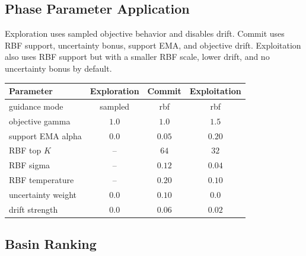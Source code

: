 \documentclass[11pt]{article}
\begin{document}
\subsection{Phase Parameter Application}

Exploration uses sampled objective behavior and disables drift. Commit uses
RBF support, uncertainty bonus, support EMA, and objective drift. Exploitation
also uses RBF support but with a smaller RBF scale, lower drift, and no
uncertainty bonus by default.

\begin{center}
\begin{tabular}{lccc}
\toprule
Parameter & Exploration & Commit & Exploitation \\
\midrule
guidance mode & sampled & rbf & rbf \\
objective gamma & $1.0$ & $1.0$ & $1.5$ \\
support EMA alpha & $0.0$ & $0.05$ & $0.20$ \\
RBF top $K$ & -- & $64$ & $32$ \\
RBF sigma & -- & $0.12$ & $0.04$ \\
RBF temperature & -- & $0.20$ & $0.10$ \\
uncertainty weight & $0.0$ & $0.10$ & $0.0$ \\
drift strength & $0.0$ & $0.06$ & $0.02$ \\
\bottomrule
\end{tabular}
\end{center}

\subsection{Basin Ranking}
\end{document}
